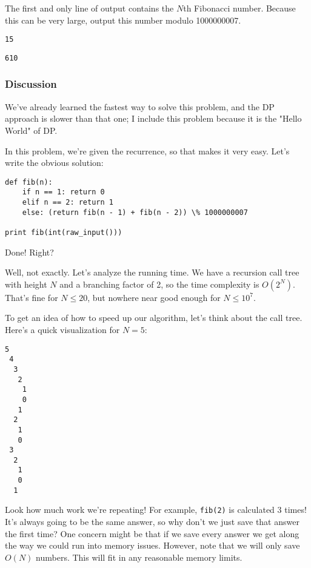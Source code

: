 The first and only line of output contains the $N$th Fibonacci number. Because this can be very large, output this number modulo 1000000007.


\begin{verbatim}
15
\end{verbatim}


\begin{verbatim}
610
\end{verbatim}

\subsubsection*{Discussion}

We've already learned the fastest way to solve this problem, and the DP approach is slower than that one; I include this problem because it is the "Hello World" of DP.

In this problem, we're given the recurrence, so that makes it very easy. Let's write the obvious solution:

\begin{verbatim}
def fib(n):
    if n == 1: return 0
    elif n == 2: return 1
    else: (return fib(n - 1) + fib(n - 2)) \% 1000000007

print fib(int(raw_input()))
\end{verbatim}

Done! Right?

Well, not exactly. Let's analyze the running time. We have a recursion call tree with height $N$ and a branching factor of 2, so the time complexity is $O(2^N)$. That's fine for $N \leq 20$, but nowhere near good enough for $N \leq 10^7$.

To get an idea of how to speed up our algorithm, let's think about the call tree. Here's a quick visualization for $N = 5$:

\begin{verbatim}
5
 4
  3
   2
    1
    0
   1
  2
   1
   0
 3
  2
   1
   0
  1
\end{verbatim}

Look how much work we're repeating! For example, \texttt{fib(2)} is calculated 3 times! It's always going to be the same answer, so why don't we just save that answer the first time? One concern might be that if we save every answer we get along the way we could run into memory issues. However, note that we will only save $O(N)$ numbers. This will fit in any reasonable memory limits.

